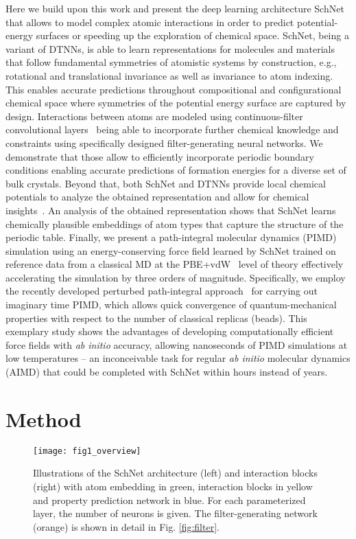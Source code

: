 \documentclass[aip,jcp,reprint,graphicx]{revtex4-1}
\newcommand{\new}[1]{#1}
\begin{document}
Here we build upon this work and present the deep learning architecture SchNet that allows to model complex atomic interactions in order to predict potential-energy surfaces or speeding up the exploration of chemical space.
SchNet, being a variant of DTNNs, is able to learn representations for molecules and materials that follow fundamental symmetries of atomistic systems by construction, e.g., rotational and translational invariance as well as invariance to atom indexing.
This enables accurate predictions throughout compositional and configurational chemical space where symmetries of the potential energy surface are captured by design.
Interactions between atoms are modeled using continuous-filter convolutional layers~\citep{schutt2017schnet} being able to incorporate further chemical knowledge and constraints using specifically designed filter-generating neural networks.
We demonstrate that those allow to efficiently incorporate periodic boundary conditions enabling accurate predictions of formation energies for a diverse set of bulk crystals.
Beyond that, both SchNet and DTNNs provide local chemical potentials to analyze the obtained representation and allow for chemical insights~\citep{schutt2017quantum}.
An analysis of the obtained representation shows that SchNet learns chemically plausible embeddings of atom types that capture the structure of the periodic table.
Finally, we present a path-integral molecular dynamics (PIMD) simulation using an energy-conserving force field learned by SchNet trained on reference data from a classical MD at the PBE+vdW~\cite{PBE1996,TS2009} level of theory effectively accelerating the simulation by three orders of magnitude. Specifically, we employ the recently developed perturbed path-integral approach~\cite{PPI2016} for carrying out imaginary time PIMD, which allows quick convergence of quantum-mechanical properties with respect to the number of classical replicas (beads).
This exemplary study shows the advantages of developing computationally efficient force fields with \textit{ab initio} accuracy, allowing nanoseconds of PIMD simulations at low temperatures -- an inconceivable task for regular \textit{ab initio} molecular dynamics (AIMD) that could be completed with SchNet within hours instead of years.

\section{Method}
\label{sec:theory}

\begin{figure}
	\texttt{[image: fig1\_overview]}
	\caption{Illustrations of the SchNet architecture (left) and interaction blocks (right) with atom embedding in green, interaction blocks in yellow and property prediction network in blue. \new{For each parameterized layer, the number of neurons is given.} The filter-generating network (orange) is shown in detail in Fig. \ref{fig:filter}.}\label{fig:overview}
\end{figure}
\end{document}
